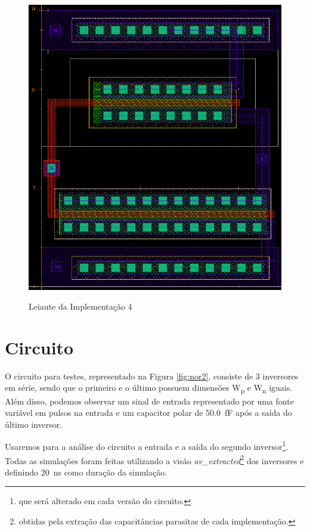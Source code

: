 \documentclass{iiufrgs}
\begin{document}
\begin{figure}[htbp]
    \centering
    \caption{Leiaute da Implementação 4}
    \includegraphics[scale=0.8]{images/layout4.png}
    \label{fig:leiaute4}
\end{figure}

\FloatBarrier

\section{Circuito}
O circuito para testes, representado na Figura \ref{fig:nor2}, consiste de 3 inversores em série, sendo que o primeiro e o último possuem dimensões W\textsubscript{p} e W\textsubscript{n} iguais. Além disso, podemos observar um sinal de entrada representado por uma fonte variável em pulsos na entrada e um capacitor polar de \SI{50.0}{\fF} após a saída do último inversor.\

Usaremos para a análise do circuito a entrada e a saída do segundo inversor\footnote{que será alterado em cada versão do circuito.}. Todas as simulações foram feitas utilizando a visão \textit{av\_extracted}\footnote{obtidas pela extração das capacitâncias parasitas de cada implementação.} dos inversores e definindo \SI{20}{\ns} como duração da simulação.
\end{document}
